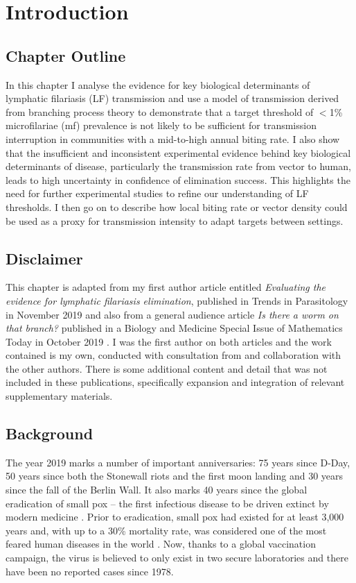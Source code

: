\section{Introduction}

\subsection{Chapter Outline}

In this chapter I analyse the evidence for key biological determinants of lymphatic filariasis (LF) transmission and use a model of transmission derived from branching process theory to demonstrate that a target threshold of $<$1\% microfilariae (mf) prevalence is not likely to be sufficient for transmission interruption in communities with a mid-to-high annual biting rate. I also show that the insufficient and inconsistent experimental evidence behind key biological determinants of disease, particularly the transmission rate from vector to human, leads to high uncertainty in confidence of elimination success. This highlights the need for further experimental studies to refine our understanding of LF thresholds. I then go on to describe how local biting rate or vector density could be used as a proxy for transmission intensity to adapt targets between settings. 

\subsection{Disclaimer}

This chapter is adapted from my first author article entitled \textit{Evaluating the evidence for lymphatic filariasis elimination}, published in Trends in Parasitology in November 2019 \cite{Davis2019} and also from a general audience article \textit{Is there a worm on that branch?} published in a Biology and Medicine Special Issue of Mathematics Today in October 2019 \cite{Davis2019_MathsToday}. I was the first author on both articles and the work contained is my own, conducted with consultation from and collaboration with the other authors. There is some additional content and detail that was not included in these publications, specifically expansion and integration of relevant supplementary materials.

\subsection{Background}

The year 2019 marks a number of important anniversaries: 75 years since D-Day, 50 years since both the Stonewall riots and the first moon landing and 30 years since the fall of the Berlin Wall. It also marks 40 years since the global eradication of small pox -- the first infectious disease to be driven extinct by modern medicine \cite{Breman1980}. Prior to eradication, small pox had existed for at least 3,000 years and, with up to a 30\% mortality rate, was considered one of the most feared human diseases in the world \cite{Hopkins2002}. Now, thanks to a global vaccination campaign, the virus is believed to only exist in two secure laboratories and there have been no reported cases since 1978.

